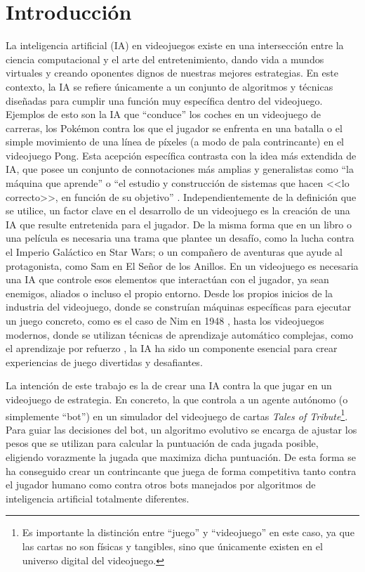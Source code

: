 \chapter{Introducción} \label{chap:introduccion}

La inteligencia artificial (IA) en videojuegos existe en una intersección entre la ciencia computacional y el arte del entretenimiento, dando vida a mundos virtuales y creando oponentes dignos de nuestras mejores estrategias. En este contexto, la IA se refiere únicamente a un conjunto de algoritmos y técnicas diseñadas para cumplir una función muy específica dentro del videojuego. Ejemplos de esto son la IA que ``conduce'' los coches en un videojuego de carreras, los Pokémon contra los que el jugador se enfrenta en una batalla o el simple movimiento de una línea de píxeles (a modo de pala contrincante) en el videojuego Pong. Esta acepción específica contrasta con la idea más extendida de IA, que posee un conjunto de connotaciones más amplias y generalistas como ``la máquina que aprende'' o ``el estudio y construcción de sistemas que hacen <<lo correcto>>, en función de su objetivo'' \cite{russell_artificial_2020}. Independientemente de la definición que se utilice, un factor clave en el desarrollo de un videojuego es la creación de una IA que resulte entretenida para el jugador. De la misma forma que en un libro o una película es necesaria una trama que plantee un desafío, como la lucha contra el Imperio Galáctico en Star Wars; o un compañero de aventuras que ayude al protagonista, como Sam en El Señor de los Anillos. En un videojuego es necesaria una IA que controle esos elementos que interactúan con el jugador, ya sean enemigos, aliados o incluso el propio entorno. Desde los propios inicios de la industria del videojuego, donde se construían máquinas específicas para ejecutar un juego concreto, como es el caso de Nim en 1948 \cite{redheffer_machine_1948}, hasta los videojuegos modernos, donde se utilizan técnicas de aprendizaje automático complejas, como el aprendizaje por refuerzo \cite{gaudreau_game_2025}, la IA ha sido un componente esencial para crear experiencias de juego divertidas y desafiantes.

La intención de este trabajo es la de crear una IA contra la que jugar en un videojuego de estrategia. En concreto, la que controla a un agente autónomo (o simplemente ``bot'') en un simulador del videojuego de cartas \textit{Tales of Tribute}\footnote{Es importante la distinción entre ``juego'' y ``videojuego'' en este caso, ya que las cartas no son físicas y tangibles, sino que únicamente existen en el universo digital del videojuego.}. Para guiar las decisiones del bot, un algoritmo evolutivo se encarga de ajustar los pesos que se utilizan para calcular la puntuación de cada jugada posible, eligiendo vorazmente la jugada que maximiza dicha puntuación. De esta forma se ha conseguido crear un contrincante que juega de forma competitiva tanto contra el jugador humano como contra otros bots manejados por algoritmos de inteligencia artificial totalmente diferentes.